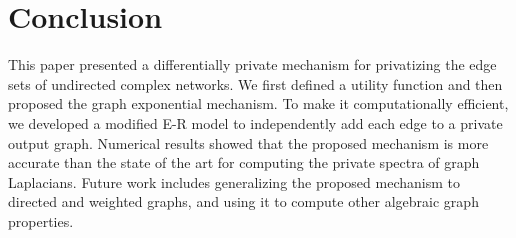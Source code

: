 \documentclass[conference]{ieeeconf}
\begin{document}



\section{Conclusion}\label{sec:V}
This paper presented a differentially private mechanism for privatizing the edge sets of undirected complex networks. We first defined a utility function and then proposed the graph exponential mechanism. To make it computationally efficient, we developed a modified E-R model to independently add each edge
to a private output graph. 
Numerical results showed that the proposed mechanism is more accurate 
than the state of the art
for computing the private spectra of graph Laplacians. 
Future work includes generalizing the proposed mechanism to directed and weighted graphs, and using it to compute other algebraic graph properties.

\balance



\end{document}
